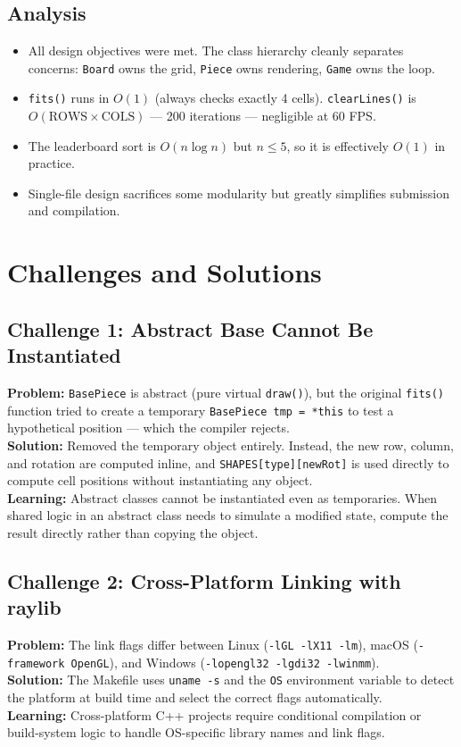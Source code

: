 \documentclass[11pt]{article}
\begin{document}
\subsection{Analysis}
\begin{itemize}
    \item All design objectives were met. The class hierarchy cleanly separates concerns: \texttt{Board} owns the grid, \texttt{Piece} owns rendering, \texttt{Game} owns the loop.
    \item \texttt{fits()} runs in $O(1)$ (always checks exactly 4 cells). \texttt{clearLines()} is $O(\text{ROWS} \times \text{COLS})$ --- 200 iterations --- negligible at 60 FPS.
    \item The leaderboard sort is $O(n \log n)$ but $n \leq 5$, so it is effectively $O(1)$ in practice.
    \item Single-file design sacrifices some modularity but greatly simplifies submission and compilation.
\end{itemize}

\section{Challenges and Solutions}

\subsection{Challenge 1: Abstract Base Cannot Be Instantiated}
\textbf{Problem:} \texttt{BasePiece} is abstract (pure virtual \texttt{draw()}), but the original \texttt{fits()} function tried to create a temporary \texttt{BasePiece tmp = *this} to test a hypothetical position --- which the compiler rejects.\\
\textbf{Solution:} Removed the temporary object entirely. Instead, the new row, column, and rotation are computed inline, and \texttt{SHAPES[type][newRot]} is used directly to compute cell positions without instantiating any object.\\
\textbf{Learning:} Abstract classes cannot be instantiated even as temporaries. When shared logic in an abstract class needs to simulate a modified state, compute the result directly rather than copying the object.

\subsection{Challenge 2: Cross-Platform Linking with raylib}
\textbf{Problem:} The link flags differ between Linux (\texttt{-lGL -lX11 -lm}), macOS (\texttt{-framework OpenGL}), and Windows (\texttt{-lopengl32 -lgdi32 -lwinmm}).\\
\textbf{Solution:} The Makefile uses \texttt{uname -s} and the \texttt{OS} environment variable to detect the platform at build time and select the correct flags automatically.\\
\textbf{Learning:} Cross-platform C++ projects require conditional compilation or build-system logic to handle OS-specific library names and link flags.
\end{document}
